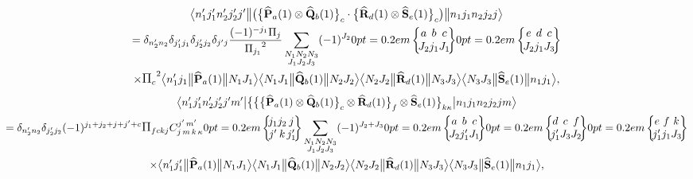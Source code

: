 \begin{multline*}
\braOketred{ n_{1}^{\prime} j_{1}^{\prime} n_{2}^{\prime} j_{2}^{\prime} j^{\prime}}{\bigl(\bigl\{\widehat{\vect{P}}_{a}(1) \otimes \widehat{\vect{Q}}_{b}(1)\bigr\}_{c} \cdot\bigl\{\widehat{\vect{R}}_{d}(1) \otimes \widehat{\vect{S}}_{e}(1)\bigr\}_{c}\bigr)}{n_{1} j_{1} n_{2} j_{2} j} \\
=\delta_{n_{2}^{\prime} n_{2}} \delta_{j_{1}^{\prime} j_{1}} \delta_{j_{2}^{\prime} j_{2}} \delta_{j^{\prime} j} \frac{(-1)^{-j_{1}} \Fact{j}}{\Fact{j_{1}}^{2}} \sum_{\substack{N_{1} N_{2} N_{3} \\ J_{1} J_{2} J_{3}}}(-1)^{J_{2}}
\sixj{a}{b}{c}{J_{2}}{j_{1}}{J_{1}}
\sixj{e}{d}{c}{J_{2}}{j_{1}}{J_{3}} \\
\times \Fact{c}^{2}
\braOketred{ n_{1}^{\prime} j_{1}}{\widehat{\vect{P}}_{a}(1)}{ N_{1} J_{1}}
\braOketred{ N_{1} J_{1}}{\widehat{\vect{Q}}_{b}(1)}{ N_{2} J_{2}}
\braOketred{ N_{2} J_{2}}{\widehat{\vect{R}}_{d}(1)}{ N_{3} J_{3}}
\braOketred{ N_{3} J_{3}}{\widehat{\vect{S}}_{e}(1)}{ n_{1} j_{1}},
\end{multline*}
\begin{multline} 
\braOket{ n_{1}^{\prime} j_{1}^{\prime} n_{2}^{\prime} j_{2}^{\prime} j^{\prime} m^{\prime}}{\bigl\{\bigl\{\bigl\{\widehat{\vect{P}}_{a}(1) \otimes \widehat{\vect{Q}}_{b}(1)\bigr\}_{c} \otimes \widehat{\vect{R}}_{d}(1)\bigr\}_{f} \otimes \widehat{\vect{S}}_{e}(1)\bigr\}_{k \kappa}}{n_{1} j_{1} n_{2} j_{2} j m} \\
=\delta_{n_{2}^{\prime} n_{2}} \delta_{j_{2}^{\prime} j_{2}}(-1)^{j_{1}+j_{2}+j+j^{\prime}+c} \Fact{f c k j} 
\clebsch{j}{m}{k}{\kappa}{j^{\prime}}{m^{\prime}}
\sixj{j_{1}}{j_{2}}{j}{j^{\prime}}{k}{j_{1}^{\prime}}\sum_{\substack{N_{1} N_{2} N_{3} \\ J_{1} J_{2} J_{3}}}(-1)^{J_{2}+J_{3}}
\sixj{a}{b}{c}{J_{2}}{j_{1}^{\prime}}{J_{1}}
\sixj{d}{c}{f}{j_{1}^{\prime}}{J_{3}}{J_{2}}
\sixj{e}{f}{k}{j_{1}^{\prime}}{j_{1}}{J_{3}} \\
\times
\braOketred{ n_{1}^{\prime} j_{1}^{\prime}}{\widehat{\vect{P}}_{a}(1)}{ N_{1} J_{1}}
\braOketred{ N_{1} J_{1}}{\widehat{\vect{Q}}_{b}(1)}{ N_{2} J_{2}}
\braOketred{ N_{2} J_{2}}{\widehat{\vect{R}}_{d}(1)}{ N_{3} J_{3}}
\braOketred{N_{3} J_{3}}{\widehat{\vect{S}}_{e}(1)}{ n_{1} j_{1}}, \label{eq:13:1:48}
\end{multline}
